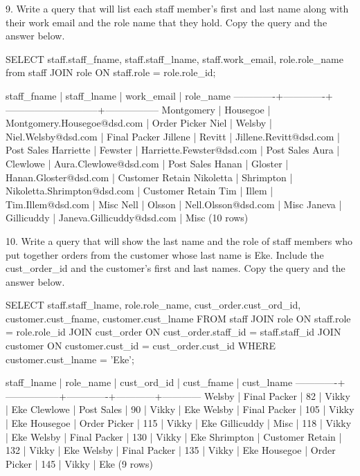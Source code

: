 9. Write a query that will list each staff member's first and last name along with their work email and the role name that they hold. Copy the query and the answer below.
\begin{sql}
SELECT staff.staff_fname, staff.staff_lname, staff.work_email, role.role_name from staff
JOIN role ON staff.role = role.role_id;
\end{sql}
\begin{pseudo*}
 staff_fname | staff_lname |         work_email          |    role_name    
-------------+-------------+-----------------------------+-----------------
 Montgomery  | Housegoe    | Montgomery.Housegoe@dsd.com | Order Picker
 Niel        | Welsby      | Niel.Welsby@dsd.com         | Final Packer
 Jillene     | Revitt      | Jillene.Revitt@dsd.com      | Post Sales
 Harriette   | Fewster     | Harriette.Fewster@dsd.com   | Post Sales
 Aura        | Clewlowe    | Aura.Clewlowe@dsd.com       | Post Sales
 Hanan       | Gloster     | Hanan.Gloster@dsd.com       | Customer Retain
 Nikoletta   | Shrimpton   | Nikoletta.Shrimpton@dsd.com | Customer Retain
 Tim         | Illem       | Tim.Illem@dsd.com           | Misc
 Nell        | Olsson      | Nell.Olsson@dsd.com         | Misc
 Janeva      | Gillicuddy  | Janeva.Gillicuddy@dsd.com   | Misc
(10 rows)
\end{pseudo*}

10. Write a query that will show the last name and the role of staff members who put together orders from the customer whose last name is Eke. Include the cust\_order\_id and the customer's first and last names. Copy the query and the answer below.
\begin{sql}
SELECT staff.staff_lname, role.role_name, cust_order.cust_ord_id, customer.cust_fname, customer.cust_lname FROM staff
JOIN role ON staff.role = role.role_id
JOIN cust_order ON cust_order.staff_id = staff.staff_id
JOIN customer ON customer.cust_id = cust_order.cust_id
WHERE customer.cust_lname = 'Eke';
\end{sql}
\begin{pseudo*}
 staff_lname |    role_name    | cust_ord_id | cust_fname | cust_lname 
-------------+-----------------+-------------+------------+------------
 Welsby      | Final Packer    |          82 | Vikky      | Eke
 Clewlowe    | Post Sales      |          90 | Vikky      | Eke
 Welsby      | Final Packer    |         105 | Vikky      | Eke
 Housegoe    | Order Picker    |         115 | Vikky      | Eke
 Gillicuddy  | Misc            |         118 | Vikky      | Eke
 Welsby      | Final Packer    |         130 | Vikky      | Eke
 Shrimpton   | Customer Retain |         132 | Vikky      | Eke
 Welsby      | Final Packer    |         135 | Vikky      | Eke
 Housegoe    | Order Picker    |         145 | Vikky      | Eke
(9 rows)
\end{pseudo*}

